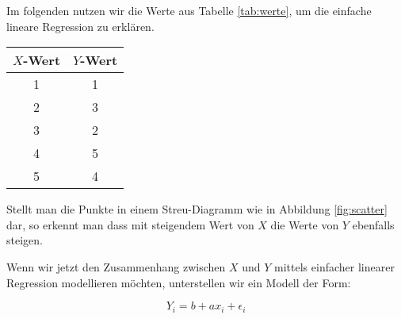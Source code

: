 \documentclass[ngerman, 12pt]{scrartcl}
\begin{document}
Im folgenden nutzen wir die Werte aus Tabelle \ref{tab:werte}, um die einfache lineare Regression zu erklären.

\begin{center}
\begin{tabular}{cc} \toprule[2pt]
$X$-Wert & $Y$-Wert \\ \midrule
        1 &1\\
        2 &3\\
        3 &2\\
        4 &5\\
        5 &4\\ \bottomrule[2pt]
\end{tabular}
\end{center}
\label{tab:werte}\vspace*{1em}

Stellt man die Punkte in einem Streu-Diagramm wie in Abbildung \ref{fig:scatter} dar, so erkennt man dass mit steigendem Wert von $X$ die Werte von $Y$ ebenfalls steigen.

\begin{center}
\vspace*{1em}
\label{fig:scatter}\vspace*{1em}
\end{center}

Wenn wir jetzt den Zusammenhang zwischen $X$ und $Y$ mittels einfacher linearer Regression modellieren möchten, unterstellen wir ein Modell der Form: 
   
\begin{equation}
	 Y_i = b + a x_i + \epsilon_i
\end{equation}
   
\end{document}
